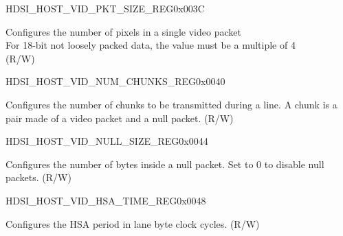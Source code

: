 \begin{register}{H}{DSI\_HOST\_VID\_PKT\_SIZE\_REG}{0x003C}\label{regdesc:DSIHOSTVIDPKTSIZEREG}
%
%
\regnewline%
\begin{regdesc}\begin{reglist}
\label{fielddesc:DSIHOSTVIDPKTSIZE}\item [DSI\_HOST\_VID\_PKT\_SIZE] Configures the number of pixels in a single video packet\\
For 18-bit not loosely packed data, the value must be a multiple of 4\\
(R/W)
\end{reglist}\end{regdesc}
\end{register}


\begin{register}{H}{DSI\_HOST\_VID\_NUM\_CHUNKS\_REG}{0x0040}\label{regdesc:DSIHOSTVIDNUMCHUNKSREG}
%
%
\regnewline%
\begin{regdesc}\begin{reglist}
\label{fielddesc:DSIHOSTVIDNUMCHUNKS}\item [DSI\_HOST\_VID\_NUM\_CHUNKS] Configures the number of chunks to be transmitted during a line. A chunk is a pair made of a video packet and a null packet. (R/W)
\end{reglist}\end{regdesc}
\end{register}


\begin{register}{H}{DSI\_HOST\_VID\_NULL\_SIZE\_REG}{0x0044}\label{regdesc:DSIHOSTVIDNULLSIZEREG}
%
%
\regnewline%
\begin{regdesc}\begin{reglist}
\label{fielddesc:DSIHOSTVIDNULLSIZE}\item [DSI\_HOST\_VID\_NULL\_SIZE] Configures the number of bytes inside a null packet. Set to 0 to disable null packets. (R/W)
\end{reglist}\end{regdesc}
\end{register}


\begin{register}{H}{DSI\_HOST\_VID\_HSA\_TIME\_REG}{0x0048}\label{regdesc:DSIHOSTVIDHSATIMEREG}
%
%
\regnewline%
\begin{regdesc}\begin{reglist}
\label{fielddesc:DSIHOSTVIDHSATIME}\item [DSI\_HOST\_VID\_HSA\_TIME] Configures the HSA period in lane byte clock cycles. (R/W)
\end{reglist}\end{regdesc}
\end{register}


